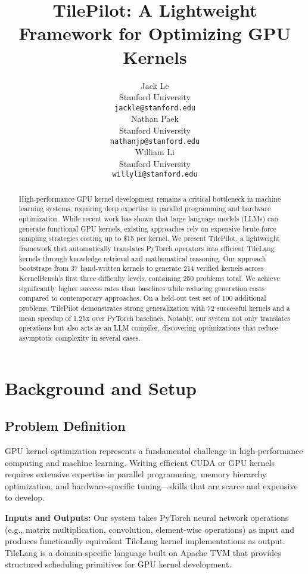 \documentclass{article}
\title{TilePilot: A Lightweight Framework for Optimizing GPU Kernels}
\author{%
  Jack Le\\
  Stanford University\\
  \texttt{jackle@stanford.edu} \\
  \And
  Nathan Paek\\
  Stanford University\\
  \texttt{nathanjp@stanford.edu} \\
  \And
  William Li\\
  Stanford University\\
  \texttt{willyli@stanford.edu} \\
}
\begin{document}
\maketitle

\begin{abstract}
High-performance GPU kernel development remains a critical bottleneck in machine learning systems, requiring deep expertise in parallel programming and hardware optimization. While recent work has shown that large language models (LLMs) can generate functional GPU kernels, existing approaches rely on expensive brute-force sampling strategies costing up to \$15 per kernel. We present TilePilot, a lightweight framework that automatically translates PyTorch operators into efficient TileLang \cite{tilelang2025} kernels through knowledge retrieval and mathematical reasoning. Our approach bootstraps from 37 hand-written kernels to generate 214 verified kernels across KernelBench's \cite{ouyang2025kernelbenchllmswriteefficient} first three difficulty levels, containing 250 problems total. We achieve significantly higher success rates than baselines while reducing generation costs compared to contemporary approaches. On a held-out test set of 100 additional problems, TilePilot demonstrates strong generalization with 72 successful kernels and a mean speedup of 1.25x over PyTorch baselines. Notably, our system not only translates operations but also acts as an LLM compiler, discovering optimizations that reduce asymptotic complexity in several cases.
\end{abstract}

\section{Background and Setup}

\subsection{Problem Definition}

GPU kernel optimization represents a fundamental challenge in high-performance computing and machine learning. Writing efficient CUDA or GPU kernels requires extensive expertise in parallel programming, memory hierarchy optimization, and hardware-specific tuning—skills that are scarce and expensive to develop.

\textbf{Inputs and Outputs:} Our system takes PyTorch neural network operations (e.g., matrix multiplication, convolution, element-wise operations) as input and produces functionally equivalent TileLang kernel implementations as output. TileLang \cite{tilelang2025} is a domain-specific language built on Apache TVM that provides structured scheduling primitives for GPU kernel development.
\end{document}
